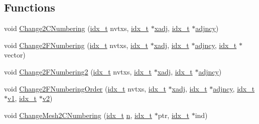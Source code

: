 \subsection*{Functions}
\begin{DoxyCompactItemize}
\item 
void \hyperlink{a00200_a0f7905bc763999e507fa86607deba727}{Change2\+C\+Numbering} (\hyperlink{a00876_aaa5262be3e700770163401acb0150f52}{idx\+\_\+t} nvtxs, \hyperlink{a00876_aaa5262be3e700770163401acb0150f52}{idx\+\_\+t} $\ast$\hyperlink{a00879_aa8fc7f75458e38e1e2979ed6db639164}{xadj}, \hyperlink{a00876_aaa5262be3e700770163401acb0150f52}{idx\+\_\+t} $\ast$\hyperlink{a00879_a20c068e3ebdd8f9889fb82c1f677d679}{adjncy})
\item 
void \hyperlink{a00200_a8acc37888a4e42ea0cbff2b900d69617}{Change2\+F\+Numbering} (\hyperlink{a00876_aaa5262be3e700770163401acb0150f52}{idx\+\_\+t} nvtxs, \hyperlink{a00876_aaa5262be3e700770163401acb0150f52}{idx\+\_\+t} $\ast$\hyperlink{a00879_aa8fc7f75458e38e1e2979ed6db639164}{xadj}, \hyperlink{a00876_aaa5262be3e700770163401acb0150f52}{idx\+\_\+t} $\ast$\hyperlink{a00879_a20c068e3ebdd8f9889fb82c1f677d679}{adjncy}, \hyperlink{a00876_aaa5262be3e700770163401acb0150f52}{idx\+\_\+t} $\ast$vector)
\item 
void \hyperlink{a00200_a98a33de92ef1e76f819f5c9b7bdd4294}{Change2\+F\+Numbering2} (\hyperlink{a00876_aaa5262be3e700770163401acb0150f52}{idx\+\_\+t} nvtxs, \hyperlink{a00876_aaa5262be3e700770163401acb0150f52}{idx\+\_\+t} $\ast$\hyperlink{a00879_aa8fc7f75458e38e1e2979ed6db639164}{xadj}, \hyperlink{a00876_aaa5262be3e700770163401acb0150f52}{idx\+\_\+t} $\ast$\hyperlink{a00879_a20c068e3ebdd8f9889fb82c1f677d679}{adjncy})
\item 
void \hyperlink{a00200_a2702c825bdbbad60eba093760445070b}{Change2\+F\+Numbering\+Order} (\hyperlink{a00876_aaa5262be3e700770163401acb0150f52}{idx\+\_\+t} nvtxs, \hyperlink{a00876_aaa5262be3e700770163401acb0150f52}{idx\+\_\+t} $\ast$\hyperlink{a00879_aa8fc7f75458e38e1e2979ed6db639164}{xadj}, \hyperlink{a00876_aaa5262be3e700770163401acb0150f52}{idx\+\_\+t} $\ast$\hyperlink{a00879_a20c068e3ebdd8f9889fb82c1f677d679}{adjncy}, \hyperlink{a00876_aaa5262be3e700770163401acb0150f52}{idx\+\_\+t} $\ast$\hyperlink{a00563_a3d803e0c4632bc09e2b354d3f886f21d}{v1}, \hyperlink{a00876_aaa5262be3e700770163401acb0150f52}{idx\+\_\+t} $\ast$\hyperlink{a00563_ab67228b8fa7f3169c3dc47e49373c570}{v2})
\item 
void \hyperlink{a00200_ac325b86234ebda623e1b8c3f555196d2}{Change\+Mesh2\+C\+Numbering} (\hyperlink{a00876_aaa5262be3e700770163401acb0150f52}{idx\+\_\+t} \hyperlink{a00623_a781a04ab095280f838ff3eb0e51312e0}{n}, \hyperlink{a00876_aaa5262be3e700770163401acb0150f52}{idx\+\_\+t} $\ast$ptr, \hyperlink{a00876_aaa5262be3e700770163401acb0150f52}{idx\+\_\+t} $\ast$ind)

\end{DoxyCompactItemize}
